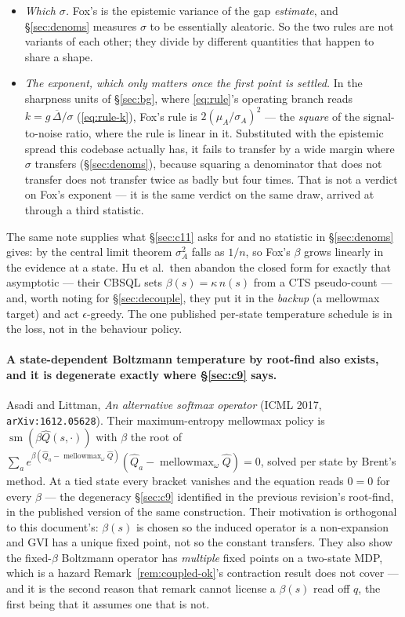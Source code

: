 \documentclass{article}
\DeclareMathOperator{\mmax}{mellowmax}
\DeclareMathOperator{\sm}{sm}
\newcommand{\gapbar}{\overline{\Delta}}
\newcommand{\srank}{\sigma}
\begin{document}
\begin{itemize}
  \item \emph{Which $\sigma$.} Fox's is the epistemic variance of the gap \emph{estimate}, and
  \S\ref{sec:denoms} measures $\srank$ to be essentially aleatoric. So the two rules are not
  variants of each other; they divide by different quantities that happen to share a shape.
  \item \emph{The exponent, which only matters once the first point is settled.} In the
  sharpness units of \S\ref{sec:bg}, where \eqref{eq:rule}'s operating branch reads
  $k = g\,\gapbar/\srank$ (\eqref{eq:rule-k}), Fox's rule is $2(\mu_A/\sigma_A)^2$ --- the
  \emph{square} of the signal-to-noise ratio, where the rule is linear in it. Substituted with the
  epistemic spread this codebase actually has, it fails to transfer by a wide margin where
  $\srank$ transfers (\S\ref{sec:denoms}), because squaring a denominator that does not
  transfer does not transfer twice as badly but four times. That is not a verdict on Fox's
  exponent --- it is the same verdict on the same draw, arrived at through a third statistic.
\end{itemize}

The same note supplies what \S\ref{sec:c11} asks for and no statistic in \S\ref{sec:denoms}
gives: by the central limit theorem $\sigma_A^2$ falls as $1/n$, so Fox's $\beta$ grows linearly
in the evidence at a state. Hu et al.\ then abandon the closed form for exactly that asymptotic
--- their CBSQL sets $\beta(s) = \kappa\, n(s)$ from a CTS pseudo-count --- and, worth noting for
\S\ref{sec:decouple}, they put it in the \emph{backup} (a mellowmax target) and act
$\epsilon$-greedy. The one published per-state temperature schedule is in the loss, not in the
behaviour policy.

\paragraph{A state-dependent Boltzmann temperature by root-find also exists, and it is degenerate
exactly where \S\ref{sec:c9} says.} Asadi and Littman, \emph{An alternative softmax operator}
(ICML 2017, \texttt{arXiv:1612.05628}). Their maximum-entropy mellowmax policy is
$\sm(\beta \hat{Q}(s,\cdot))$ with $\beta$ the root of
$\sum_a e^{\beta(\hat{Q}_a - \mmax_\omega \hat{Q})}(\hat{Q}_a - \mmax_\omega \hat{Q}) = 0$, solved per
state by Brent's method. At a tied state every bracket vanishes and the equation reads $0 = 0$
for every $\beta$ --- the degeneracy \S\ref{sec:c9} identified in the previous revision's
root-find, in the published version of the same construction. Their motivation is orthogonal to
this document's: $\beta(s)$ is chosen so the induced operator is a non-expansion and GVI has a
unique fixed point, not so the constant transfers. They also show the fixed-$\beta$ Boltzmann
operator has \emph{multiple} fixed points on a two-state MDP, which is a hazard
Remark~\ref{rem:coupled-ok}'s contraction result does not cover --- and it is the second reason
that remark cannot license a $\beta(s)$ read off $q$, the first being that it assumes one that is
not.
\end{document}

